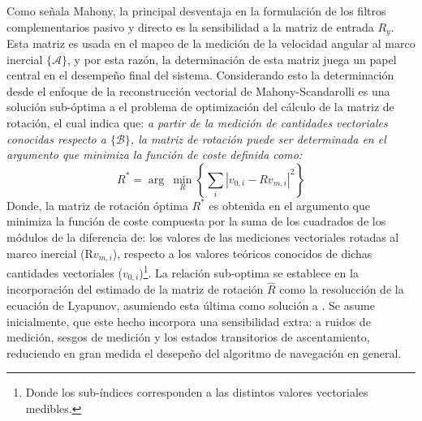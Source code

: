 \documentclass[conference]{IEEEtran}
\newcommand{\marco}[1]{\{\mathcal{#1}\}}
\begin{document}
Como señala Mahony, la principal desventaja en la formulación de los filtros complementarios pasivo y directo es la sensibilidad a la matriz de entrada $R_y$. Esta matriz es usada en el mapeo de la medición de la velocidad angular al marco inercial $\marco{A}$, y por esta razón, la determinación de esta matriz juega un papel central en el desempeño final del sistema. Considerando esto la determinación desde el enfoque de la reconstrucción vectorial de Mahony-Scandarolli es una solución sub-óptima a el problema de optimización del cálculo de la matriz de rotación, el cual indica que: \emph{a partir de la medición de cantidades vectoriales conocidas respecto a $\marco{B}$, la matriz de rotación puede ser determinada en el argumento que minimiza la función de coste definida como:}
\begin{equation}\label{ProblemaOptimizacion}
R^*=\arg~\min_{R}\left\{\sum_i|v_{0,i}-Rv_{m,i}|^2\right\}
\end{equation}
Donde, la matriz de rotación óptima $R^*$ es obtenida en el argumento que minimiza la función de coste compuesta por la suma de los cuadrados de los módulos de la diferencia de: los valores de las mediciones vectoriales rotadas al marco inercial (R$v_{m,i}$), respecto a los valores teóricos conocidos de dichas cantidades vectoriales ($v_{0,i}$)\footnote{Donde los sub-índices corresponden a las distintos valores vectoriales medibles.}.
La relación sub-optima se establece en la incorporación del estimado de la matriz de rotación $\hat{R}$ como la resolucción de la ecuación de Lyapunov, asumiendo esta última como solución a \label{ProblemaOptimizacion}. Se asume inicialmente, que este hecho incorpora una sensibilidad extra: a ruidos de medición, sesgos de medición y los estados transitorios de ascentamiento, reduciendo en gran medida el desepeño del algoritmo de navegación en general. 
\end{document}
